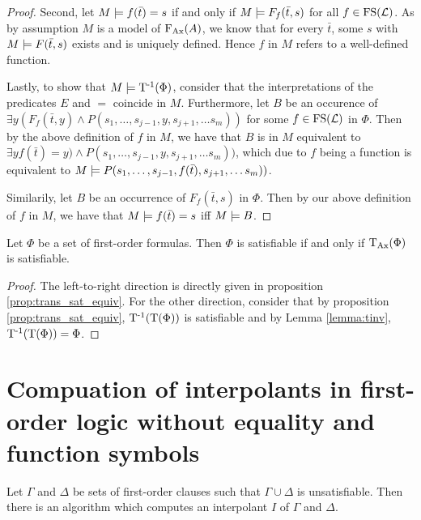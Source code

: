 \begin{proof}
	Second, let $M\models f(\bar t) = s$ if and only if $M\models F_f(\bar t, s)$ for all $f \in \operatorname{FS}(\operatorname{\mathcal{L}})$.
	As by assumption $M$ is a model of $\operatorname{F_{Ax}}(A)$, we know that for every $\bar t$, some $s$ with $M\models F(\bar t, s)$ exists and is uniquely defined.
	Hence $f$ in $M$ refers to a well-defined function.

	Lastly, to show that $M \models \operatorname{T^{-1}}(\Phi)$, 
	consider that the interpretations of the predicates $E$ and $=$ coincide in $M$.
	Furthermore, let $B$ be an occurence of $\exists y (F_f(\bar t, y) \land P(s_1, \ldots, s_{j-1}, y, s_{j+1}, \ldots s_m))$ for some $f \in \operatorname{FS}(\operatorname{\mathcal{L}})$ in $\Phi$.
	Then by the above definition of $f$ in $M$, we have that $B$ is in $M$ equivalent to $\exists y f(\bar t) = y) \land P(s_1, \ldots, s_{j-1}, y, s_{j+1}, \ldots s_m))$, which due to $f$ being a function is equivalent to 
	$M \models P(s_1, \ldots, s_{j-1}, f(\bar t), s_{j+1}, \ldots s_m))$.

	Similarily, let $B$ be an occurrence of $F_f(\bar t, s)$ in $\Phi$.
	Then by our above definition of $f$ in $M$, we have that $M \models f(\bar t) = s$ iff $M \models B$.
\end{proof}

\begin{corr}
	Let $\Phi$ be a set of first-order formulas.
	Then $\Phi$ is satisfiable if and only if $\operatorname{\operatorname{T}_{Ax}}(\Phi)$ is satisfiable.
\end{corr}
\begin{proof}
	The left-to-right direction is directly given in proposition \ref{prop:trans_sat_equiv}.
	For the other direction, consider that by proposition \ref{prop:trans_sat_equiv}, $\operatorname{T^{-1}}(\operatorname{T}(\Phi))$ is satisfiable and by Lemma \ref{lemma:tinv}, $\operatorname{T^{-1}}(\operatorname{T}(\Phi)) = \Phi$.
\end{proof}



\section{Compuation of interpolants in first-order logic without equality and function symbols}


\begin{thm}
	\label{thm:prop_interpol}
	Let $\Gamma$ and $\Delta$ be sets of first-order clauses such that $\Gamma \cup \Delta$ is unsatisfiable. Then there is an algorithm which computes an interpolant $I$ of $\Gamma$ and $\Delta$.
\end{thm}



